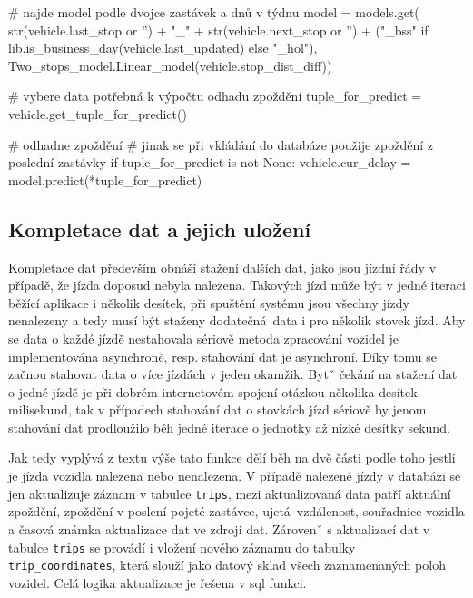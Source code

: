 \begin{code}[frame=none]
# najde model podle dvojce zastávek a dnů v týdnu
model = models.get(
  str(vehicle.last_stop or '') + "_" +
  str(vehicle.next_stop or '') +
  ("_bss" if lib.is_business_day(vehicle.last_updated) else "_hol"),
  Two_stops_model.Linear_model(vehicle.stop_dist_diff))

# vybere data potřebná k výpočtu odhadu zpoždění
tuple_for_predict = vehicle.get_tuple_for_predict()

# odhadne zpoždění
# jinak se při vkládání do databáze použije zpoždění z poslední zastávky
if tuple_for_predict is not None:
  vehicle.cur_delay = model.predict(*tuple_for_predict)
\end{code}

\subsection{Kompletace dat a jejich uložení}

Kompletace dat především obnáší stažení dalších dat, jako jsou jízdní řády v případě, že jízda doposud nebyla nalezena. Takových jízd může být v jedné iteraci běžící aplikace i několik desítek, při spuštění systému jsou všechny jízdy nenalezeny a tedy musí být staženy dodatečná data i pro několik stovek jízd. Aby se data o každé jízdě nestahovala sériově metoda zpracování vozidel je implementována asynchroně, resp. stahování dat je asynchroní. Díky tomu se začnou stahovat data o více jízdách v jeden okamžik. Bytˇ čekání na stažení dat o jedné jízdě je při dobrém internetovém spojení otázkou několika desítek milisekund, tak v případech stahování dat o stovkách jízd sériově by jenom stahování dat prodloužilo běh jedné iterace o jednotky až nízké desítky sekund.

\bigbreak

Jak tedy vyplývá z textu výše tato funkce dělí běh na dvě části podle toho jestli je jízda vozidla nalezena nebo nenalezena. V případě nalezené jízdy v databázi se jen aktualizuje záznam v tabulce \verb-trips-, mezi aktualizovaná data patří aktuální zpoždění, zpoždění v poslení pojeté zastávce, ujetá vzdálenost, souřadnice vozidla a časová známka aktualizace dat ve zdroji dat. Zárovenˇ s aktualizací dat v tabulce \verb-trips- se provádí i vložení nového záznamu do tabulky \verb-trip_coordinates-, která slouží jako datový sklad všech zaznamenaných poloh vozidel. Celá logika aktualizace je řešena v \gls{sql} funkci.

